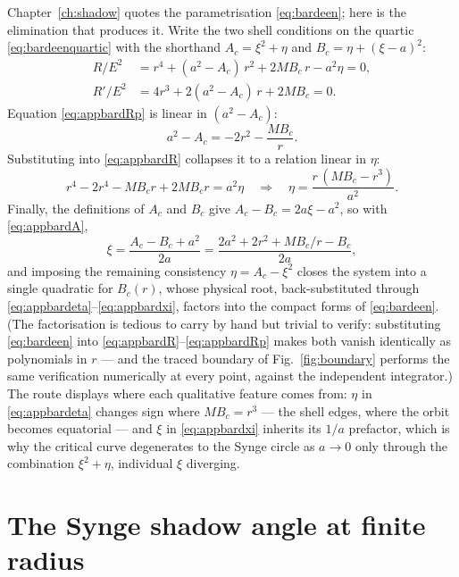 Chapter~\ref{ch:shadow} quotes the parametrisation
\eqref{eq:bardeen}; here is the elimination that produces it. Write
the two shell conditions on the quartic \eqref{eq:bardeenquartic}
with the shorthand $A_c = \xi^2 + \eta$ and
$B_c = \eta + (\xi - a)^2$:
\begin{align}
R/E^2 &= r^4 + (a^2 - A_c)\,r^2 + 2MB_c\,r - a^2\eta = 0,
\label{eq:appbardR}\\
R'/E^2 &= 4r^3 + 2(a^2 - A_c)\,r + 2MB_c = 0 .
\label{eq:appbardRp}
\end{align}
Equation \eqref{eq:appbardRp} is linear in $(a^2 - A_c)$:
\begin{equation}
a^2 - A_c = -2r^2 - \frac{MB_c}{r} .
\label{eq:appbardA}
\end{equation}
Substituting into \eqref{eq:appbardR} collapses it to a relation
linear in $\eta$:
\begin{equation}
r^4 - 2r^4 - MB_c r + 2MB_c r = a^2\eta
\quad\Longrightarrow\quad
\eta = \frac{r\,(MB_c - r^3)}{a^2} .
\label{eq:appbardeta}
\end{equation}
Finally, the definitions of $A_c$ and $B_c$ give
$A_c - B_c = 2a\xi - a^2$, so with \eqref{eq:appbardA},
\begin{equation}
\xi = \frac{A_c - B_c + a^2}{2a}
= \frac{2a^2 + 2r^2 + MB_c/r - B_c}{2a} ,
\label{eq:appbardxi}
\end{equation}
and imposing the remaining consistency $\eta = A_c - \xi^2$ closes
the system into a single quadratic for $B_c(r)$, whose physical root,
back-substituted through
\eqref{eq:appbardeta}--\eqref{eq:appbardxi}, factors into the
compact forms of \eqref{eq:bardeen}. (The factorisation is tedious to
carry by hand but trivial to verify: substituting
\eqref{eq:bardeen} into \eqref{eq:appbardR}--\eqref{eq:appbardRp}
makes both vanish identically as polynomials in $r$ — and the traced
boundary of Fig.~\ref{fig:boundary} performs the same verification
numerically at every point, against the independent integrator.) The
route displays where each qualitative feature comes from: $\eta$ in
\eqref{eq:appbardeta} changes sign where $MB_c = r^3$ — the shell
edges, where the orbit becomes equatorial — and $\xi$ in
\eqref{eq:appbardxi} inherits its $1/a$ prefactor, which is why the
critical curve degenerates to the Synge circle as $a \to 0$ only
through the combination $\xi^2 + \eta$, individual $\xi$ diverging.

\section{The Synge shadow angle at finite radius}
\label{app:synge}

